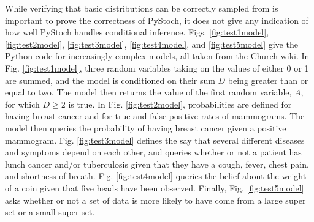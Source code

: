 \documentclass[12pt,letterpaper]{article}
\begin{document}
While verifying that basic distributions can be correctly sampled from
is important to prove the correctness of PyStoch, it does not give any
indication of how well PyStoch handles conditional inference.
Figs. \ref{fig:test1model}, \ref{fig:test2model},
\ref{fig:test3model}, \ref{fig:test4model}, and \ref{fig:test5model}
give the Python code for increasingly complex models, all taken from
the Church wiki.  In Fig. \ref{fig:test1model}, three random variables
taking on the values of either 0 or 1 are summed, and the model is
conditioned on their sum $D$ being greater than or equal to two.  The
model then returns the value of the first random variable, $A$, for
which $D\geq 2$ is true.  In Fig. \ref{fig:test2model}, probabilities
are defined for having breast cancer and for true and false positive
rates of mammograms.  The model then queries the probability of having
breast cancer given a positive mammogram.  Fig. \ref{fig:test3model}
defines the say that several different diseases and symptoms depend on
each other, and queries whether or not a patient has lunch cancer
and/or tuberculosis given that they have a cough, fever, chest pain,
and shortness of breath.  Fig. \ref{fig:test4model} queries the belief
about the weight of a coin given that five heads have been observed.
Finally, Fig. \ref{fig:test5model} asks whether or not a set of data
is more likely to have come from a large super set or a small super set.
\end{document}
